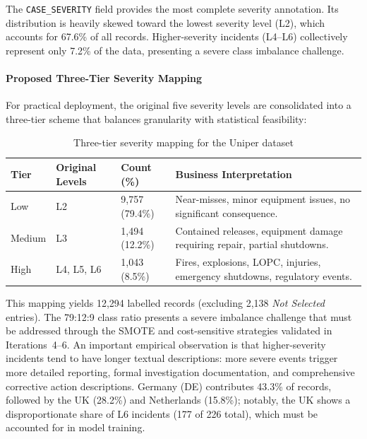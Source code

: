 \documentclass[11pt, titlepage, bibliography=totoc]{scrreprt}
\begin{document}
The \texttt{CASE\_SEVERITY} field provides the most complete severity annotation. Its distribution is heavily skewed toward the lowest severity level (L2), which accounts for 67.6\% of all records. Higher-severity incidents (L4--L6) collectively represent only 7.2\% of the data, presenting a severe class imbalance challenge.

\paragraph{Proposed Three-Tier Severity Mapping}
For practical deployment, the original five severity levels are consolidated into a three-tier scheme that balances granularity with statistical feasibility:

\begin{table}[H]
\centering
\caption{Three-tier severity mapping for the Uniper dataset}
\label{tab:three_tier}
\begin{tabular}{llll}
\toprule
\textbf{Tier} & \textbf{Original Levels} & \textbf{Count (\%)} & \textbf{Business Interpretation} \\
\midrule
Low    & L2         & 9{,}757 (79.4\%) & Near-misses, minor equipment issues, no significant consequence. \\
Medium & L3         & 1{,}494 (12.2\%) & Contained releases, equipment damage requiring repair, partial shutdowns. \\
High   & L4, L5, L6 & 1{,}043 (8.5\%)  & Fires, explosions, LOPC, injuries, emergency shutdowns, regulatory events. \\
\bottomrule
\end{tabular}
\end{table}

This mapping yields 12{,}294 labelled records (excluding 2{,}138 \textit{Not Selected} entries). The 79:12:9 class ratio presents a severe imbalance challenge that must be addressed through the SMOTE and cost-sensitive strategies validated in Iterations~4--6. An important empirical observation is that higher-severity incidents tend to have longer textual descriptions: more severe events trigger more detailed reporting, formal investigation documentation, and comprehensive corrective action descriptions. Germany (DE) contributes 43.3\% of records, followed by the UK (28.2\%) and Netherlands (15.8\%); notably, the UK shows a disproportionate share of L6 incidents (177 of 226 total), which must be accounted for in model training.

\end{document}
